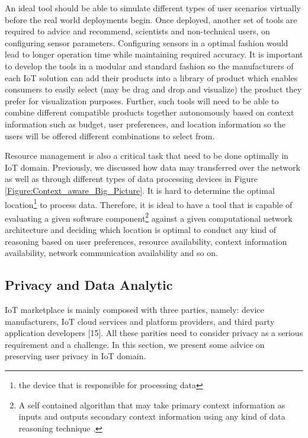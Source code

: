 \documentclass[journal]{IEEEtran}
\begin{document}
   An ideal tool should be able to simulate different types of user scenarios virtually before the real world deployments begin.   Once deployed, another set of tools are required to advice and recommend, scientists and non-technical users, on configuring sensor parameters. Configuring sensors in a optimal fashion would lead to longer operation time while maintaining required accuracy. It is important to develop the tools in a modular and standard fashion so the manufacturers of each IoT solution can add their products into a library of product which enables consumers to easily select (may be drag and drop and visualize) the product they prefer for visualization purposes. Further, such tools will need to be able to combine different compatible products together autonomously based on context information such as budget, user preferences, and location information so the users will be offered different combinations to select from.
   
   
Resource  management is also a critical task that need to be done optimally in IoT domain. Previously, we discussed how data may transferred over the network as well as through different types of data processing devices in Figure \ref{Figure:Context_aware_Big_Picture}. It is hard to determine the optimal location\footnote{the device that is responsible for processing data} to process data. Therefore, it is  ideal to have a tool that is capable of evaluating a given software component\footnote{A self contained algorithm that may take primary context information as inputs and outputs secondary context information using any kind of data reasoning technique \cite{ZMP007}.} against a given   computational network architecture and deciding which location is optimal to conduct any kind of reasoning  based on user preferences, resource availability, context information availability, network communication availability and so on.
    
    
    \subsection{Privacy and Data Analytic}
    
 IoT marketplace is mainly composed with three parties, namely: device manufacturers, IoT cloud services and platform providers, and third party application developers [15]. All these parities need to consider privacy as a serious requirement and a challenge. In this section, we present some advice on preserving user privacy in IoT domain.     
       
\end{document}
